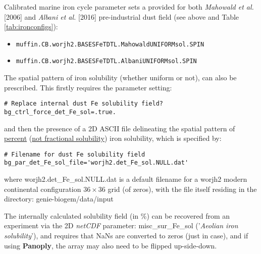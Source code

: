 Calibrated marine iron cycle parameter sets a provided for both \textit{Mahowald et al.} [2006] and \textit{Albani et al.} [2016] pre-industrial dust field (see above and Table \ref{tab:ironconfigs}):
\begin{itemize}[noitemsep]
\vspace{1mm}
\item \texttt{muffin.CB.worjh2.BASESFeTDTL.MahowaldUNIFORMsol.SPIN}
\vspace{1mm}
\item \texttt{muffin.CB.worjh2.BASESFeTDTL.AlbaniUNIFORMsol.SPIN}
\end{itemize}

\vspace{2mm}
\noindent The spatial pattern of iron solubility (whether uniform or not), can also be prescribed. This firstly requires the parameter setting:
\small\vspace{-2pt}\begin{verbatim}
# Replace internal dust Fe solubility field?
bg_ctrl_force_det_Fe_sol=.true.
\end{verbatim}\vspace{-2pt}\normalsize
and then the presence of a 2D ASCII file delineating the spatial pattern of \uline{percent} (\uline{not fractional solubility}) iron solubility, which is specified by:
\small\vspace{-2pt}\begin{verbatim}
# Filename for dust Fe solubility field
bg_par_det_Fe_sol_file='worjh2.det_Fe_sol.NULL.dat'
\end{verbatim}\vspace{-2pt}\normalsize
where \textsf{\footnotesize worjh2.det\_Fe\_sol.NULL.dat} is a default filename for a \textsf{\footnotesize worjh2} modern continental configuration \(36\times36\) grid (of zeros), with the file itself residing in the directory: \textsf{\footnotesize genie-biogem/data/input}

The internally calculated solubility field (in \%) can be recovered from an experiment via the 2D \textit{netCDF} parameter: \textsf{\footnotesize misc\_sur\_Fe\_sol} (\textsf{\footnotesize '\textit{Aeolian iron solubility}'}), and requires that NaNs are converted to zeros (just in case), and if using \textbf{Panoply}, the array may also need to be flipped up-side-down.

